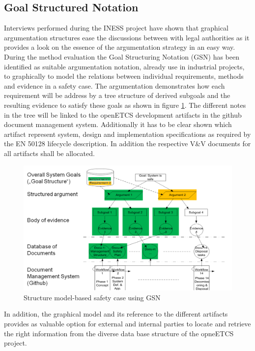\documentclass{template/openetcs_report}
\begin{document}
\subsection{Goal Structured Notation}

Interviews performed during the INESS project have shown that graphical argumentation structures ease the discussions between with legal authorities as it provides a look on the essence of the argumentation strategy in an easy way. During the method evaluation the Goal Structuring Notation (GSN) \cite{Kelly.2004thegoal, GSNwebsite} has been identified as suitable argumentation notation, already use in industrial projects, to  graphically  to model the relations between individual requirements, methods and evidence in a safety case. The argumentation demonstrates how each requirement will be address by a tree structure of derived subgoals and the resulting evidence to satisfy these goals as shown in figure \ref{fig:GSN-SafetyCase}. The different notes in the tree will be linked to the openETCS development artifacts in the github document management system. Additionally it has to be clear shown which artifact represent system, design and implementation specifications as required by the EN 50128 lifecycle description. In addition the respective V\&V documents for all artifacts shall be allocated.
 
\begin{figure}[htbp]
\centering
\includegraphics[width=0.9\linewidth]{./images/Structure-SC-GSN}
\caption{Structure model-based safety case using GSN}
\label{fig:GSN-SafetyCase}
\end{figure}

 In addition, the graphical model and its reference to the different artifacts provides as valuable option for external and internal parties to locate and retrieve the right information from the diverse data base structure of the opneETCS project.
\end{document}
